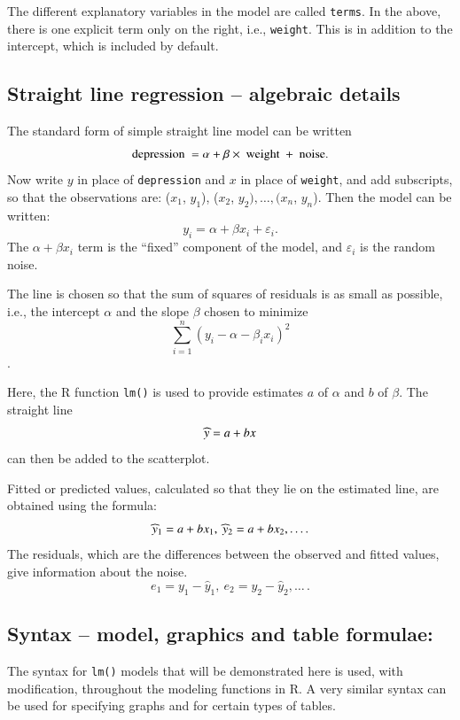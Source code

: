 \documentclass{tufte-book}\usepackage[]{graphicx}\usepackage[]{color}
\begin{document}
The different explanatory variables in the model are called
\texttt{terms}.  In the above, there is one explicit term only on the
right, i.e., \texttt{weight}. This is in addition to the intercept,
which is included by default.

\subsection{Straight line regression -- algebraic details}\label{ss:briefls}
The standard form of simple straight line model can be written\vspace*{-1pt}
\[ \mbox{depression } = \alpha + \beta \times \mbox{ weight } + \mbox{ noise}.
\vspace*{-4pt}
\]
Now write $y$ in place of \texttt{depression} and $x$ in place of
\texttt{weight}, and add subscripts, so that the observations are:
($x_{1}$, $y_{1}$), ($x_{2}$, $y_{2}),\ldots{,} (x_{n}$, $y_{n}$).  Then
the model can be written:
 \[ y_{i} = \alpha + \beta x_{i} + \varepsilon_{i}.\]
The $\alpha +
\beta x_{i}$ term is the ``fixed'' component of the model, and
$\varepsilon_{i}$ is the random noise.

The line is chosen so that the sum of squares of residuals is as small
as possible, i.e., the intercept
$\alpha$ and the slope $\beta$ chosen to minimize
\[ \sum_{i=1}^n (y_i - \alpha - \beta_i x_i)^2 \].

Here, the R function \verb!lm()! is used to provide estimates $a$ of
$\alpha$ and $b$ of $\beta$. The straight line \vspace*{-2pt}
\[ \widehat{y} = a + b x
\vspace*{-2pt}
\]
can then be added to the scatterplot.

Fitted or predicted values, calculated so that they lie on the
estimated line, are obtained using the formula: \vspace*{-2pt}
\[ \widehat{y}_1 = a + bx_1, \ \widehat{y}_2 = a + bx_2,\ldots{.}
\vspace*{-2pt}
\]
The residuals, which are the differences between the
observed and fitted values, give information about the noise.
\vspace*{-2pt}
\begin{equation}
e_1 = y_1 - \widehat{y}_1, \ e_2 = y_2 - \widehat{y}_2,\ldots{\,.}
\label{e_i}
\end{equation}

\subsection{Syntax -- model, graphics and table formulae:}
The syntax for \texttt{lm()} models that will be demonstrated here is
used, with modification, throughout the modeling functions in R.  A
very similar syntax can be used for specifying graphs and for certain
types of tables.
\end{document}
